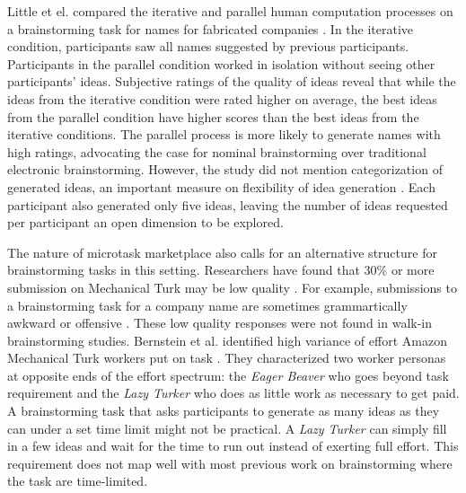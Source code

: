 Little et el. compared the iterative and parallel human computation processes on a brainstorming task for names for fabricated companies \cite{little2010exploring}. In the iterative condition, participants saw all names suggested by previous participants. Participants in the parallel condition worked in isolation without seeing other participants' ideas. Subjective ratings of the quality of ideas reveal that while the ideas from the iterative condition were rated higher on average, the best ideas from the parallel condition have higher scores than the best ideas from the iterative conditions. The parallel process is more likely to generate names with high ratings, advocating the case for nominal brainstorming over traditional electronic brainstorming. However, the study did not mention categorization of generated ideas, an important measure on flexibility of idea generation \cite{lewis2011affective, nijstad_how_2006, finke1992creative, shah2003metrics}. Each participant also generated only five ideas, leaving the number of ideas requested per participant an open dimension to be explored.

The nature of microtask marketplace also calls for an alternative structure for brainstorming tasks in this setting. Researchers have found that 30\% or more submission on Mechanical Turk may be low quality \cite{kittur2008crowdsourcing}. For example, submissions to a brainstorming task for a company name are sometimes grammartically awkward or offensive \cite{little2010exploring}. These low quality responses were not found in walk-in brainstorming studies. Bernstein et al. identified high variance of effort Amazon Mechanical Turk workers put on task \cite{soylent}. They characterized two worker personas at opposite ends of the effort spectrum: the {\em Eager Beaver\/} who goes beyond task requirement and the {\em Lazy Turker\/} who does as little work as necessary to get paid. A brainstorming task that asks participants to generate as many ideas as they can under a set time limit might not be practical. A {\em Lazy Turker\/} can simply fill in a few ideas and wait for the time to run out instead of exerting full effort. This requirement does not map well with most previous work on brainstorming where the task are time-limited. 



